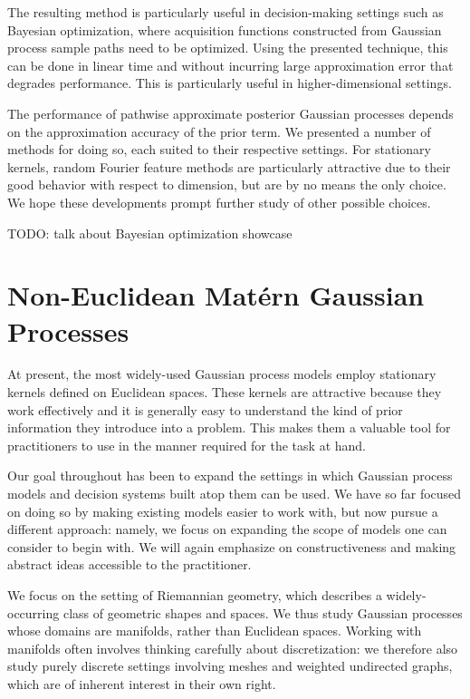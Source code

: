 \documentclass[11pt]{book}
\begin{document}
The resulting method is particularly useful in decision-making settings such as Bayesian optimization, where acquisition functions constructed from Gaussian process sample paths need to be optimized.
Using the presented technique, this can be done in linear time and without incurring large approximation error that degrades performance.
This is particularly useful in higher-dimensional settings.

The performance of pathwise approximate posterior Gaussian processes depends on the approximation accuracy of the prior term.
We presented a number of methods for doing so, each suited to their respective settings.
For stationary kernels, random Fourier feature methods are particularly attractive due to their good behavior with respect to dimension, but are by no means the only choice.
We hope these developments prompt further study of other possible choices.

TODO: talk about Bayesian optimization showcase






\chapter{Non-Euclidean Matérn Gaussian Processes}
\label{ch:noneuclidean}

At present, the most widely-used Gaussian process models employ stationary kernels defined on Euclidean spaces.
These kernels are attractive because they work effectively and it is generally easy to understand the kind of prior information they introduce into a problem.
This makes them a valuable tool for practitioners to use in the manner required for the task at hand.

Our goal throughout has been to expand the settings in which Gaussian process models and decision systems built atop them can be used.
We have so far focused on doing so by making existing models easier to work with, but now pursue a different approach: namely, we focus on expanding the scope of models one can consider to begin with.
We will again emphasize on constructiveness and making abstract ideas accessible to the practitioner.

We focus on the setting of Riemannian geometry, which describes a widely-occurring class of geometric shapes and spaces.
We thus study Gaussian processes whose domains are manifolds, rather than Euclidean spaces.
Working with manifolds often involves thinking carefully about discretization: we therefore also study purely discrete settings involving meshes and weighted undirected graphs, which are of inherent interest in their own right.
\end{document}
